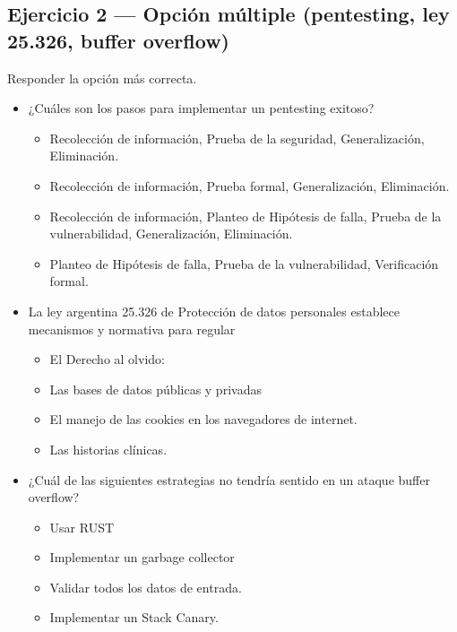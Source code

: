 \subsection{Ejercicio 2 --- Opción múltiple (pentesting, ley 25.326, buffer overflow)}

\begin{consigna}
Responder la opción más correcta.
\begin{itemize}
  \item ¿Cuáles son los pasos para implementar un pentesting exitoso?
  \begin{itemize}
    \item Recolección de información, Prueba de la seguridad, Generalización, Eliminación.
    \item Recolección de información, Prueba formal, Generalización, Eliminación.
    \item Recolección de información, Planteo de Hipótesis de falla, Prueba de la
    vulnerabilidad, Generalización, Eliminación.
    \item Planteo de Hipótesis de falla, Prueba de la vulnerabilidad, Verificación formal.
  \end{itemize}
  \item La ley argentina 25.326 de Protección de datos personales establece mecanismos y
  normativa para regular
  \begin{itemize}
    \item El Derecho al olvido:
    \item Las bases de datos públicas y privadas
    \item El manejo de las cookies en los navegadores de internet.
    \item Las historias clínicas.
  \end{itemize}
  \item ¿Cuál de las siguientes estrategias no tendría sentido en un ataque buffer overflow?
  \begin{itemize}
    \item Usar RUST
    \item Implementar un garbage collector
    \item Validar todos los datos de entrada.
    \item Implementar un Stack Canary.
  \end{itemize}
\end{itemize}
\end{consigna}

